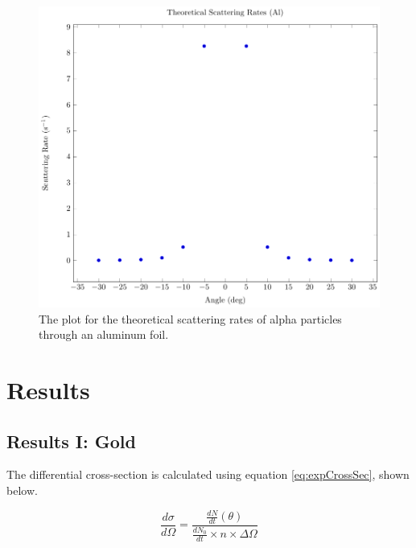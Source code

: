 \documentclass[a4paper]{article}
\begin{document}
\begin{figure}[H]
  \begin{center}
    \includegraphics[scale=0.8]{Plots/TheoreticalScatteringRatesAl/theoScatRatesAl.pdf}
  \end{center}
  \caption{The plot for the theoretical scattering rates of alpha particles
    through an aluminum foil.}
  \label{gph:theoScatRateAl}
\end{figure}

\section{Results}

\subsection{Results I: Gold}

\qq

\qq

\qq The differential cross-section is calculated using equation \ref{eq:expCrossSec}, shown below.

\begin{equation} \label{eq:expCrossSec}
 \frac{d \sigma}{d \Omega} = \frac
                                 {
								  \frac{dN}{dt} ( \theta )
								}
								{
								  \frac{dN_0}{dt}
								  \times n
								  \times \Delta \Omega
                                 }
\end{equation}
\end{document}
